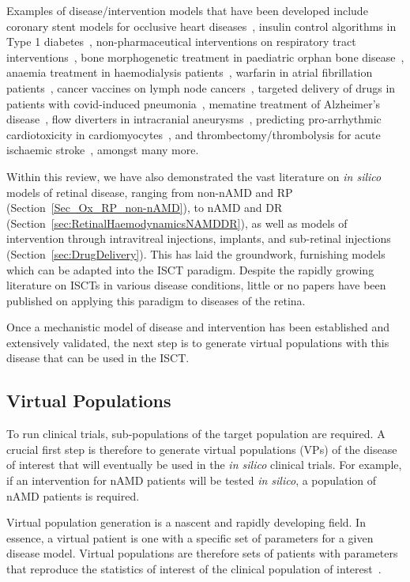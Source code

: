 \documentclass{article}
\begin{document}
Examples of disease/intervention models that have been developed include coronary stent models for occlusive heart diseases~\cite{Antonini2021, Berti2021}, insulin control algorithms in Type 1 diabetes~\cite{Kovatchev2009}, non-pharmaceutical interventions on respiratory tract interventions~\cite{Arsene2022}, bone morphogenetic treatment in paediatric orphan bone disease~\cite{Carlier2018}, anaemia treatment in haemodialysis patients~\cite{Fuertinger2018}, warfarin in atrial fibrillation patients~\cite{Ravvaz2017}, cancer vaccines on lymph node cancers~\cite{Gaffney2022}, targeted delivery of drugs in patients with covid-induced pneumonia~\cite{Wang2022}, mematine treatment of Alzheimer’s disease~\cite{Swietlik2022}, flow diverters in intracranial aneurysms~\cite{SarramiForoushani2021}, predicting pro-arrhythmic cardiotoxicity in cardiomyocytes~\cite{Passini2017}, and thrombectomy/thrombolysis for acute ischaemic stroke~\cite{Konduri2020}, amongst many more.

Within this review, we have also demonstrated the vast literature on \textit{in silico} models of retinal disease, ranging from non-nAMD and RP (Section~\ref{Sec_Ox_RP_non-nAMD}), to nAMD and DR (Section~\ref{sec:RetinalHaemodynamicsNAMDDR}), as well as models of intervention through intravitreal injections, implants, and sub-retinal injections (Section~\ref{sec:DrugDelivery}).
This has laid the groundwork, furnishing models which can be adapted into the ISCT paradigm. Despite the rapidly growing literature on ISCTs in various disease conditions, little or no papers have been published on applying this paradigm to diseases of the retina.

Once a mechanistic model of disease and intervention has been established and extensively validated, the next step is to generate virtual populations with this disease that can be used in the ISCT.

\subsection{Virtual Populations}

To run clinical trials, sub-populations of the target population are required. A crucial first step is therefore to generate virtual populations (VPs) of the disease of interest that will eventually be used in the \textit{in silico} clinical trials. For example, if an intervention for nAMD patients will be tested \textit{in silico}, a population of nAMD patients is required.

Virtual population generation is a nascent and rapidly developing field. In essence, a virtual patient is one with a specific set of parameters for a given disease model. Virtual populations are therefore sets of patients with parameters that reproduce the statistics of interest of the clinical population of interest~\cite{Allen2016}.
\end{document}
